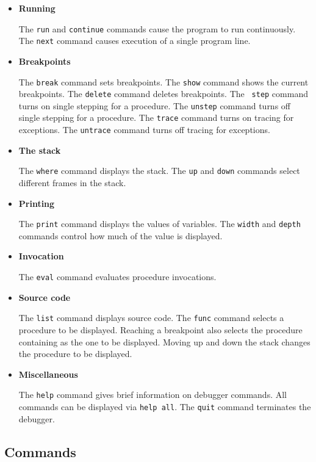 \begin{itemize}
\item{\bf Running}

The {\tt run} and {\tt continue} commands cause the program to run
continuously.  The {\tt next} command causes execution of a single program
line. 

\item{\bf Breakpoints}

The {\tt break} command sets breakpoints.  The {\tt show} command shows the
current breakpoints.  The {\tt delete} command deletes breakpoints.  The {\tt
step} command turns on single stepping for a procedure.  The {\tt unstep}
command turns off single stepping for a procedure.  The {\tt trace} command
turns on tracing for exceptions.  The {\tt untrace} command turns off tracing
for exceptions.

\item{\bf The stack}

The {\tt where} command displays the stack.  The {\tt up} and {\tt down}
commands select different frames in the stack.

\item{\bf Printing}

The {\tt print} command displays the values of variables.  The {\tt width} and
{\tt depth} commands control how much of the value is displayed.

\item{\bf Invocation}

The {\tt eval} command evaluates procedure invocations.

\item{\bf Source code}

The {\tt list} command displays source code.  The {\tt func} command selects a
procedure to be displayed.  Reaching a breakpoint also selects the procedure
containing as the one to be displayed.  Moving up and down the stack changes
the procedure to be displayed.

\item{\bf Miscellaneous}

The {\tt help} command gives brief information on debugger commands.  All
commands can be displayed via {\tt help all}.  The {\tt quit} command
terminates the debugger.

\end{itemize}

\subsection{Commands}

